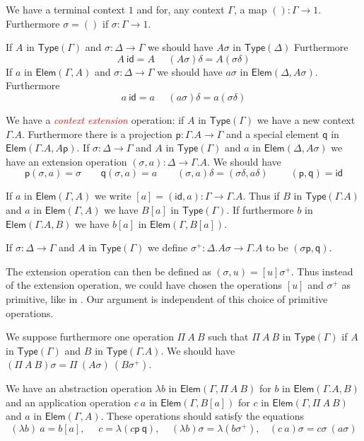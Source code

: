 \documentclass[11pt,a4paper]{article}
\theoremstyle{definition}
\newcommand{\Elem}{\mathsf{Elem}}
\newcommand{\Type}{\mathsf{Type}}
\newcommand{\id}{\mathsf{id}}
\newcommand{\pp}{\mathsf{p}}
\newcommand{\qq}{\mathsf{q}}
\newcommand{\EMP}[1]{\emph{\textcolor{red}{#1}}}
\begin{document}
We have a terminal context $1$ and for, any context $\Gamma$, a map
$():\Gamma\rightarrow 1$. Furthermore $\sigma = ()$ if
$\sigma:\Gamma\rightarrow 1$.

 If $A$ in $\Type(\Gamma)$ and $\sigma:\Delta\rightarrow\Gamma$
 we should have $A\sigma$ in $\Type(\Delta)$
Furthermore 
$$A~\id = A~~~~~~(A\sigma)\delta = A(\sigma\delta)$$
If $a$ in $\Elem(\Gamma,A)$ and $\sigma:\Delta\rightarrow\Gamma$
we should have $a\sigma$ in $\Elem(\Delta,A\sigma)$.
Furthermore 
$$a~\id = a~~~~~~(a\sigma)\delta = a(\sigma\delta)$$

 We have a \EMP{context extension} operation: if $A$ in $\Type(\Gamma)$ we have
a new context $\Gamma.A$. Furthermore there is a projection
$\pp:\Gamma.A\rightarrow \Gamma$ and a special element
$\qq$ in $\Elem(\Gamma.A,A\pp)$. If $\sigma: \Delta\rightarrow \Gamma$ and
$A$ in $\Type(\Gamma)$ and $a$ in $\Elem(\Delta,A\sigma)$
we have
an extension operation $(\sigma,a):\Delta\rightarrow \Gamma.A$.
We should have 
$$\pp (\sigma,a) = \sigma~~~~~~~~~\qq (\sigma,a) = a~~~~~~~~~
(\sigma,a)\delta = (\sigma\delta,a\delta)~~~~~~~~~~(\pp,\qq) = \id$$

 If $a$ in $\Elem(\Gamma,A)$ we write $[a]= (\id,a):\Gamma\rightarrow \Gamma.A$.
 Thus if $B$ in $\Type(\Gamma.A)$ and $a$ in $\Elem(\Gamma,A)$
 we have $B[a]$ in $\Type(\Gamma)$.
 If furthermore $b$ in $\Elem(\Gamma.A,B)$ we have $b[a]$ in $\Elem(\Gamma,B[a])$.

 If $\sigma:\Delta\rightarrow\Gamma$ and $A$ in $\Type(\Gamma)$
 we define $\sigma^+:\Delta.A\sigma\rightarrow\Gamma.A$ to be
 $(\sigma\pp,\qq)$.

 The extension operation can then be defined as $(\sigma,u) = [u]\sigma^+$.
 Thus instead of the extension operation, we could have chosen the operations
 $[u]$ and $\sigma^+$ as primitive, like in \cite{Ehrhard}. Our argument is independent of this choice
 of primitive operations.

 We suppose furthermore one operation $\Pi~A~B$ such that
$\Pi~A~B$ in $\Type(\Gamma)$ if $A$ in $\Type(\Gamma)$ and $B$ in $\Type(\Gamma.A)$.
We should have $(\Pi~A~B)\sigma = \Pi~(A\sigma)~(B\sigma^+)$.

We have an abstraction operation $\lambda b$ in $\Elem(\Gamma,\Pi~A~B)$
for $b$ in $\Elem(\Gamma.A,B)$
and an application operation $c~a$ in $\Elem(\Gamma,B[a])$
for $c$ in $\Elem(\Gamma,\Pi~A~B)$ and $a$ in $\Elem(\Gamma,A)$.
These operations should satisfy the equations
$$
{(\lambda b)}~{a} = b[a],~~~~~~c = \lambda (c\pp~\qq),~~~~~
(\lambda b)\sigma = \lambda (b\sigma^+),~~~~
({c}~{a})\sigma = {c\sigma}~{(a\sigma)}
$$
\end{document}
